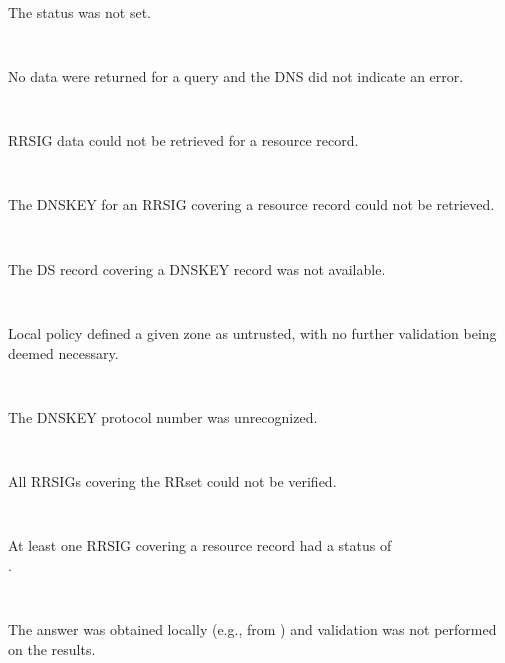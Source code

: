 \begin{description}
\begin{description}
\begin{description}

\item {}\verb" "

The status was not set.

\item {}\verb" "

No data were returned for a query and the DNS did not indicate an error.

\item {}\verb" "

RRSIG data could not be retrieved for a resource record.

\item {}\verb" "

The DNSKEY for an RRSIG covering a resource record could not be retrieved.

\item {}\verb" "

The DS record covering a DNSKEY record was not available.

\item {}\verb" "

Local policy defined a given zone as untrusted, with no further validation
being deemed necessary.

\item {}\verb" "

The DNSKEY protocol number was unrecognized.

\item {}\verb" "

All RRSIGs covering the RRset could not be verified.

\item {}\verb" "

At least one RRSIG covering a resource record had a status of \\
.

\item {}\verb" "

The answer was obtained locally (e.g., from ) and validation
was not performed on the results.

\item {}\verb" "


\end{description}
\end{description}
\end{description}
